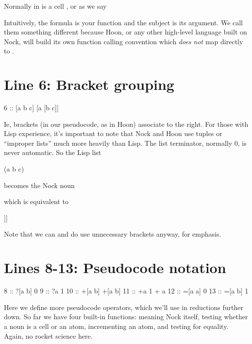 Normally  in  is a cell \kode{[s f]}, or as we say

\begin{code}
\end{code}
Intuitively, the formula is your function and the subject is its argument.  We
call them something different because Hoon, or any other high-level language
built on Nock, will build its own function calling convention which \emph{does not}
map directly to .

\section{Line 6: Bracket grouping}

\begin{code}
6  ::    [a b c]           [a [b c]]
\end{code}
Ie, brackets (in our pseudocode, as in Hoon) associate to the right.  For those
with Lisp experience, it's important to note that Nock and Hoon use tuples or
``improper lists'' much more heavily than Lisp.  The list terminator, normally 0,
is never automatic.  So the Lisp list 

\begin{code}
(a b c)
\end{code}
becomes the Nock noun

\begin{code}
[a b c 0]
\end{code}
which is equivalent to

\begin{code}
[a [b [c 0]]]
\end{code}
Note that we can and do use unnecessary brackets anyway, for
emphasis.

\section{Lines 8-13: Pseudocode notation}

\begin{code}
8  ::    ?[a b]           0
9  ::    ?a               1
10 ::    +[a b]           +[a b]
11 ::    +a               1 + a
12 ::    =[a a]           0
13 ::    =[a b]           1
\end{code}
Here we define more pseudocode operators, which we'll use in reductions further
down.  So far we have four built-in functions: \kode{*} meaning Nock itself, 
testing whether a noun is a cell or an atom, \kode{+} incrementing an atom, and \kode{=}
testing for equality.  Again, no rocket science here.

